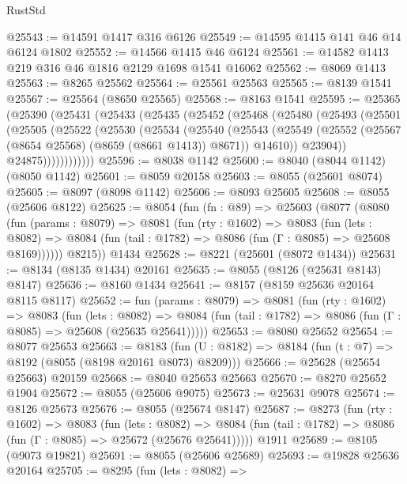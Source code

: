 \begin{lexlean}{RustStd}
\begin{coremodule}
@25543 := @14591 @1417 @316 @6126
@25549 := @14595 @1415 @141 @46 @14 @6124 @1802
@25552 := @14566 @1415 @46 @6124
@25561 := @14582 @1413 @219 @316 @46 @1816 @2129 @1698 @1541 @16062
@25562 := @8069 @1413
@25563 := @8265 @25562
@25564 := @25561 @25563
@25565 := @8139 @1541
@25567 := @25564 (@8650 @25565)
@25568 := @8163 @1541
@25595 := @25365
    (@25390
      (@25431
        (@25433
          (@25435
            (@25452
              (@25468
                (@25480
                  (@25493
                    (@25501
                      (@25505
                        (@25522
                          (@25530
                            (@25534
                              (@25540
                                (@25543
                                  (@25549
                                    (@25552 (@25567 (@8654 @25568) (@8659 (@8661 @1413)) @8671))
                                    @14610))
                                @23904))
                            @24875))))))))))))
@25596 := @8038 @1142
@25600 := @8040 (@8044 @1142) (@8050 @1142)
@25601 := @8059 @20158
@25603 := @8055 (@25601 @8074)
@25605 := @8097 (@8098 @1142)
@25606 := @8093 @25605
@25608 := @8055 (@25606 @8122)
@25625 := @8054
    (fun (fn : @89) =>
    @25603
      (@8077
        (@8080
          (fun (params : @8079) =>
          @8081
            (fun (rty : @1602) =>
            @8083
              (fun (lets : @8082) =>
              @8084 (fun (tail : @1782) => @8086 (fun (Γ : @8085) => @25608 @8169))))))
        @8215))
    @1434
@25628 := @8221 (@25601 (@8072 @1434))
@25631 := @8134 (@8135 @1434) @20161
@25635 := @8055 (@8126 (@25631 @8143) @8147)
@25636 := @8160 @1434
@25641 := @8157 (@8159 @25636 @20164 @8115 @8117)
@25652 := fun (params : @8079) =>
  @8081
    (fun (rty : @1602) =>
    @8083
      (fun (lets : @8082) =>
      @8084 (fun (tail : @1782) => @8086 (fun (Γ : @8085) => @25608 (@25635 @25641)))))
@25653 := @8080 @25652
@25654 := @8077 @25653
@25663 := @8183
    (fun (U : @8182) => @8184 (fun (t : @7) => @8192 (@8055 (@8198 @20161 @8073) @8209)))
@25666 := @25628 (@25654 @25663) @20159
@25668 := @8040 @25653 @25663
@25670 := @8270 @25652 @1904
@25672 := @8055 (@25606 @9075)
@25673 := @25631 @9078
@25674 := @8126 @25673
@25676 := @8055 (@25674 @8147)
@25687 := @8273
    (fun (rty : @1602) =>
    @8083
      (fun (lets : @8082) =>
      @8084 (fun (tail : @1782) => @8086 (fun (Γ : @8085) => @25672 (@25676 @25641)))))
    @1911
@25689 := @8105 (@9073 @19821)
@25691 := @8055 (@25606 @25689)
@25693 := @19828 @25636 @20164
@25705 := @8295
    (fun (lets : @8082) =>

\end{coremodule}
\end{lexlean}
